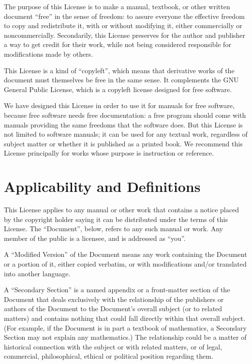 \documentclass[a4paper,11pt,twoside,dvips]{report}
\begin{document}
The purpose of this License is to make a manual, textbook, or other
written document ``free'' in the sense of freedom: to assure everyone
the effective freedom to copy and redistribute it, with or without
modifying it, either commercially or noncommercially.  Secondarily,
this License preserves for the author and publisher a way to get
credit for their work, while not being considered responsible for
modifications made by others.

This License is a kind of ``copyleft'', which means that derivative
works of the document must themselves be free in the same sense.  It
complements the GNU General Public License, which is a copyleft
license designed for free software.

We have designed this License in order to use it for manuals for free
software, because free software needs free documentation: a free
program should come with manuals providing the same freedoms that the
software does.  But this License is not limited to software manuals;
it can be used for any textual work, regardless of subject matter or
whether it is published as a printed book.  We recommend this License
principally for works whose purpose is instruction or reference.

\section{Applicability and Definitions}

This License applies to any manual or other work that contains a
notice placed by the copyright holder saying it can be distributed
under the terms of this License.  The ``Document'', below, refers to any
such manual or work.  Any member of the public is a licensee, and is
addressed as ``you''.

A ``Modified Version'' of the Document means any work containing the
Document or a portion of it, either copied verbatim, or with
modifications and/or translated into another language.

A ``Secondary Section'' is a named appendix or a front-matter section of
the Document that deals exclusively with the relationship of the
publishers or authors of the Document to the Document's overall subject
(or to related matters) and contains nothing that could fall directly
within that overall subject.  (For example, if the Document is in part a
textbook of mathematics, a Secondary Section may not explain any
mathematics.)  The relationship could be a matter of historical
connection with the subject or with related matters, or of legal,
commercial, philosophical, ethical or political position regarding
them.
\end{document}
